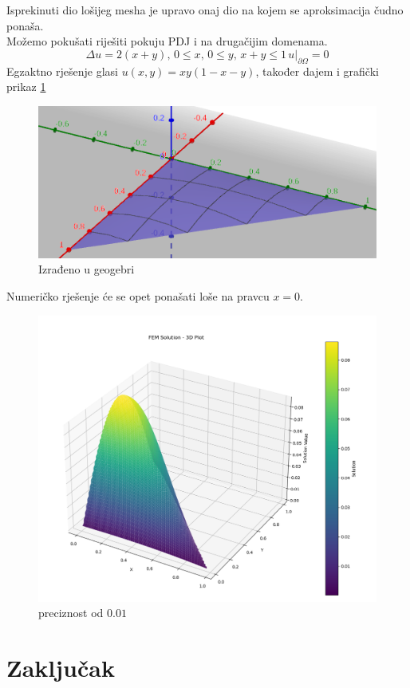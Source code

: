 \documentclass[zavrsnirad]{../fer}
\begin{document}
Isprekinuti dio lošijeg mesha je upravo onaj dio na 
kojem se aproksimacija čudno ponaša. 
\\
Možemo pokušati riješiti pokuju PDJ i na drugačijim domenama.
\begin{equation}
  \Delta u = 2(x +y),\, 0 \leq x, \, 0 \leq y, \, x + y \leq 1 
  \, u |_{ \partial \Omega} = 0
\end{equation}
Egzaktno rješenje glasi $u(x,y) = xy(1- x - y)$, također 
dajem i grafički prikaz \ref{xy1xy}
\begin{figure}[H]
	\centering
	\includegraphics[width=0.8\linewidth]{Figures/xy1xy.png}
	\caption{Izrađeno u geogebri}
  \label{xy1xy}
\end{figure}
Numeričko rješenje će se opet ponašati loše na pravcu $x=0$.

\begin{figure}[H]
	\centering
	\includegraphics[width=0.7\linewidth]{Figures/numerxy1xy.png}
	\caption{preciznost od $0.01$}
  \label{}
\end{figure}
\newpage

\chapter{Zaključak}
\label{pog:zakljucak}
\end{document}
